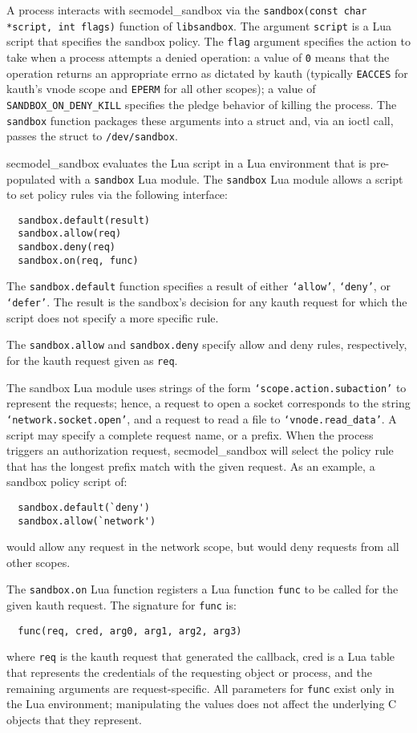 \documentclass[letterpaper,twocolumn,9pt]{article}
\begin{document}
A process interacts with secmodel\_sandbox via the \texttt{sandbox(const char
*script, int flags)} function of \texttt{libsandbox}.  The argument
\texttt{script} is a Lua script that specifies the sandbox policy.  The
\texttt{flag} argument specifies the action to take when a process attempts a
denied operation: a value of \texttt{0} means that the operation returns an
appropriate errno as dictated by kauth (typically \texttt{EACCES} for
kauth's vnode scope and \texttt{EPERM} for all other scopes); a value of
\texttt{SANDBOX\_ON\_DENY\_KILL} specifies the pledge behavior of killing
the process.  The \texttt{sandbox} function packages these arguments into a
struct and, via an ioctl call, passes the struct to \texttt{/dev/sandbox}.

secmodel\_sandbox evaluates the Lua script in a Lua environment that is
pre-populated with a \texttt{sandbox} Lua module.  The \texttt{sandbox} Lua
module allows a script to set policy rules via the following interface:

\begin{verbatim}
  sandbox.default(result)
  sandbox.allow(req)
  sandbox.deny(req)
  sandbox.on(req, func)
\end{verbatim}

The \texttt{sandbox.default} function specifies a result of either
\texttt{`allow'}, \texttt{`deny'}, or \texttt{`defer'}.  The result is the
sandbox's decision for any kauth request for which the script does not specify
a more specific rule.

The \texttt{sandbox.allow} and \texttt{sandbox.deny} specify allow and deny
rules, respectively, for the kauth request given as \texttt{req}.  

The sandbox Lua module uses strings of the form
\texttt{`scope.action.subaction'} to represent the requests; hence, a request
to open a socket corresponds to the string \texttt{`network.socket.open'}, and
a request to read a file to \texttt{`vnode.read\_data'}.  A script may specify a
complete request name, or a prefix.  When the process triggers an authorization
request, secmodel\_sandbox will select the policy rule that has the longest
prefix match with the given request.  As an example, a sandbox policy script
of:
\begin{verbatim} 
  sandbox.default(`deny') 
  sandbox.allow(`network')
\end{verbatim} 
would allow any request in the network scope, but would deny requests from all
other scopes.

The \texttt{sandbox.on} Lua function registers a Lua function \texttt{func} to
be called for the given kauth request.  The signature for \texttt{func} is:
\begin{verbatim}
  func(req, cred, arg0, arg1, arg2, arg3)
\end{verbatim}
where \texttt{req} is the kauth request that generated the callback, cred is a
Lua table that represents the credentials of the requesting object or process,
and the remaining arguments are request-specific.  All parameters for
\texttt{func} exist only in the Lua environment; manipulating the values does
not affect the underlying C objects that they represent.
\end{document}

